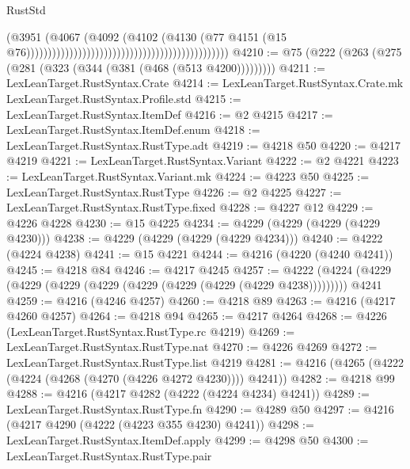 \begin{lexlean}{RustStd}
\begin{coremodule}
                                                                                    (@3951
                                                                                      (@4067
                                                                                        (@4092
                                                                                          (@4102
                                                                                            (@4130
                                                                                              (@77
                                                                                                @4151
                                                                                                (@15
                                                                                                  @76)))))))))))))))))))))))))))))))))))))))))))))))
@4210 := @75 (@222 (@263 (@275 (@281 (@323 (@344 (@381 (@468 (@513 @4200)))))))))
@4211 := LexLeanTarget.RustSyntax.Crate
@4214 := LexLeanTarget.RustSyntax.Crate.mk LexLeanTarget.RustSyntax.Profile.std
@4215 := LexLeanTarget.RustSyntax.ItemDef
@4216 := @2 @4215
@4217 := LexLeanTarget.RustSyntax.ItemDef.enum
@4218 := LexLeanTarget.RustSyntax.RustType.adt
@4219 := @4218 @50
@4220 := @4217 @4219
@4221 := LexLeanTarget.RustSyntax.Variant
@4222 := @2 @4221
@4223 := LexLeanTarget.RustSyntax.Variant.mk
@4224 := @4223 @50
@4225 := LexLeanTarget.RustSyntax.RustType
@4226 := @2 @4225
@4227 := LexLeanTarget.RustSyntax.RustType.fixed
@4228 := @4227 @12
@4229 := @4226 @4228
@4230 := @15 @4225
@4234 := @4229 (@4229 (@4229 (@4229 @4230)))
@4238 := @4229 (@4229 (@4229 (@4229 @4234)))
@4240 := @4222 (@4224 @4238)
@4241 := @15 @4221
@4244 := @4216 (@4220 (@4240 @4241))
@4245 := @4218 @84
@4246 := @4217 @4245
@4257 := @4222 (@4224 (@4229 (@4229 (@4229 (@4229 (@4229 (@4229 (@4229 (@4229 @4238))))))))) @4241
@4259 := @4216 (@4246 @4257)
@4260 := @4218 @89
@4263 := @4216 (@4217 @4260 @4257)
@4264 := @4218 @94
@4265 := @4217 @4264
@4268 := @4226 (LexLeanTarget.RustSyntax.RustType.rc @4219)
@4269 := LexLeanTarget.RustSyntax.RustType.nat
@4270 := @4226 @4269
@4272 := LexLeanTarget.RustSyntax.RustType.list @4219
@4281 := @4216 (@4265 (@4222 (@4224 (@4268 (@4270 (@4226 @4272 @4230)))) @4241))
@4282 := @4218 @99
@4288 := @4216 (@4217 @4282 (@4222 (@4224 @4234) @4241))
@4289 := LexLeanTarget.RustSyntax.RustType.fn
@4290 := @4289 @50
@4297 := @4216 (@4217 @4290 (@4222 (@4223 @355 @4230) @4241))
@4298 := LexLeanTarget.RustSyntax.ItemDef.apply
@4299 := @4298 @50
@4300 := LexLeanTarget.RustSyntax.RustType.pair

\end{coremodule}
\end{lexlean}
